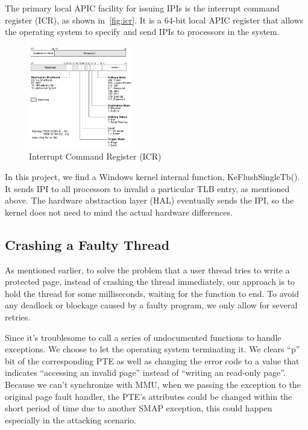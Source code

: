 The primary local APIC facility for issuing IPIs is the interrupt command register (ICR), as shown in~\autoref{fig:icr}. It is a 64-bit local APIC register that allows the operating system to specify and send IPIs to processors in the system.


\begin{figure}[th]
  \includegraphics[width=0.40\textwidth]{figures/icr}
  \centering
  \caption{Interrupt Command Register (ICR)}
  \label{fig:icr}
\end{figure}

In this project, we find a Windows kernel internal function, KeFlushSingleTb(). It sends IPI to all processors to invalid a particular TLB entry, as mentioned above. The hardware abstraction layer (HAL) eventually sends the IPI, so the kernel does not need to mind the actual hardware differences.


\subsection{Crashing a Faulty Thread}

As mentioned earlier, to solve the problem that a user thread tries to write a protected page, instead of crashing the thread immediately, our approach is to hold the thread for some milliseconds, waiting for the function to end. To avoid any deadlock or blockage caused by a faulty program, we only allow for several retries. 

Since it's troublesome to call a series of undocumented functions to handle exceptions. We choose to let the operating system terminating it. We clears ``p'' bit of the corresponding PTE as well as changing the error code to a value that indicates ``accessing an invalid page'' instead of ``writing an read-only page''. Because we can't synchronize with MMU, when we passing the exception to the original page fault handler, the PTE's attributes could be changed within the short period of time due to another SMAP exception, this could happen especially in the attacking scenario. 

